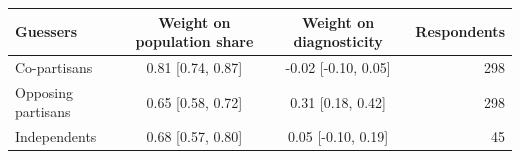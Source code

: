 \begin{tabular}{lccr}
\toprule
Guessers & Weight on population share & Weight on diagnosticity & Respondents \\
\midrule
Co-partisans & 0.81 [0.74, 0.87] & -0.02 [-0.10, 0.05] & 298 \\
Opposing partisans & 0.65 [0.58, 0.72] & 0.31 [0.18, 0.42] & 298 \\
Independents & 0.68 [0.57, 0.80] & 0.05 [-0.10, 0.19] &  45 \\
\bottomrule
\end{tabular}
